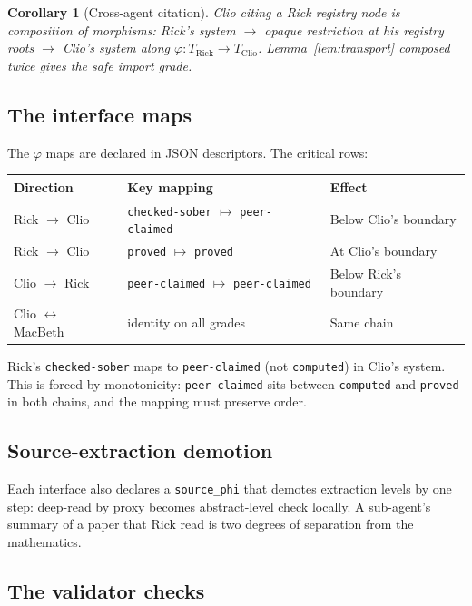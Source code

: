 \documentclass[11pt,a4paper]{article}
\newcommand{\level}[1]{\texttt{#1}}
\theoremstyle{plain}
\newtheorem{corollary}[theorem]{Corollary}
\theoremstyle{definition}
\begin{document}
\begin{corollary}[Cross-agent citation]
\label{cor:cross-agent}
Clio citing a Rick registry node is composition of morphisms: Rick's
system $\to$ opaque restriction at his registry roots $\to$ Clio's system
along $\varphi : T_{\text{Rick}} \to T_{\text{Clio}}$.
Lemma~\ref{lem:transport} composed twice gives the safe import grade.
\end{corollary}

\subsection{The interface maps}

The $\varphi$ maps are declared in JSON descriptors. The critical rows:

\begin{center}
\begin{tabular}{lll}
\toprule
Direction & Key mapping & Effect \\
\midrule
Rick $\to$ Clio & \level{checked-sober} $\mapsto$ \level{peer-claimed} & Below Clio's boundary \\
Rick $\to$ Clio & \level{proved} $\mapsto$ \level{proved} & At Clio's boundary \\
Clio $\to$ Rick & \level{peer-claimed} $\mapsto$ \level{peer-claimed} & Below Rick's boundary \\
Clio $\leftrightarrow$ MacBeth & identity on all grades & Same chain \\
\bottomrule
\end{tabular}
\end{center}

Rick's \level{checked-sober} maps to \level{peer-claimed} (not
\level{computed}) in Clio's system. This is forced by monotonicity:
\level{peer-claimed} sits between \level{computed} and \level{proved}
in both chains, and the mapping must preserve order.

\subsection{Source-extraction demotion}

Each interface also declares a \texttt{source\_phi} that demotes
extraction levels by one step: deep-read by proxy becomes abstract-level
check locally. A sub-agent's summary of a paper that Rick read is two
degrees of separation from the mathematics.

\subsection{The validator checks}
\end{document}
